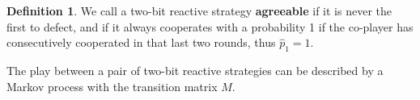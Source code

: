 \documentclass{article}
\theoremstyle{definition}
\newtheorem{definition}{Definition}[section]
\begin{document}
\begin{definition}
  We call a two-bit reactive strategy \textbf{agreeable} if it is never the
  first to defect, and if it always cooperates with a probability 1 if the
  co-player has consecutively cooperated in that last two rounds, thus \(\hat{p}_1=1\).
\end{definition}

The play between a pair of two-bit reactive strategies can be described by a
Markov process with the transition matrix \(M\).

\end{document}
